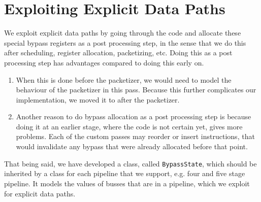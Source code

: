 



\section{Exploiting Explicit Data Paths}\label{sec:expl_bp_impl}
We exploit explicit data paths by going through the code and allocate these special bypass registers as a post processing step, in the sense that we do this after scheduling, register allocation, packetizing, etc. 
Doing this as a post processing step has advantages compared to doing this early on. 
\begin{enumerate}
\item When this is done before the packetizer, we would need to model the behaviour of the packetizer in this pass. Because this further complicates our implementation, we moved it to after the packetizer.
\item Another reason to do bypass allocation as a post processing step is because doing it at an earlier stage, where the code is not certain yet, gives more problems. Each of the custom passes may reorder or insert instructions, that would invalidate any bypass that were already allocated before that point.
\end{enumerate}

That being said, we have developed a class, called \texttt{BypassState}, which should be inherited by a class for each pipeline that we support, e.g. four and five stage pipeline. It models the values of busses that are in a pipeline, which we exploit for explicit data paths. %

